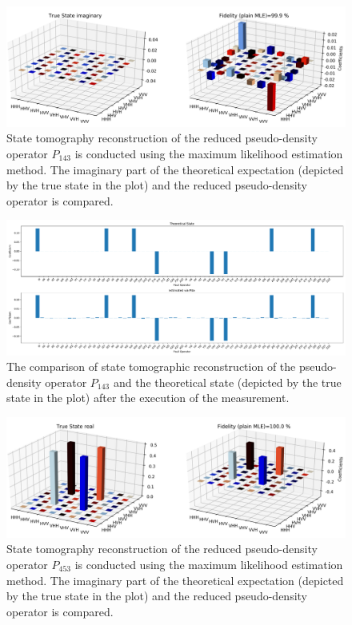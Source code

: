 \documentclass[fleqn,usenatbib]{mnras}
\begin{document}
\begin{figure}
\centering
\includegraphics[width=\textwidth]{plots/three_d_plot_imaginary_plain MLE_crop.png}
    \caption{ State tomography reconstruction of the reduced pseudo-density operator $P_{143}$ is conducted using the maximum likelihood estimation method. The imaginary part of the theoretical expectation (depicted by the true state in the plot) and the reduced pseudo-density operator is compared.}
    \label{f9}
\end{figure}




\begin{figure}
\centering
	\includegraphics[width=\textwidth]{plots/bar.pdf}
    \caption{The comparison of state tomographic reconstruction of the pseudo-density operator $P_{143}$ and the theoretical state (depicted by the true state in the plot) after the execution of the measurement.}
    \label{f10}
\end{figure}


\begin{figure}
\centering
\includegraphics[width=\textwidth]{plots/interaction_three_d_plot_real_plain MLE_crop.png}
    \caption{ State tomography reconstruction of the reduced pseudo-density operator $P_{453}$ is conducted using the maximum likelihood estimation method. The imaginary part of the theoretical expectation (depicted by the true state in the plot) and the reduced pseudo-density operator is compared.}
    \label{f11}
\end{figure}
\end{document}
